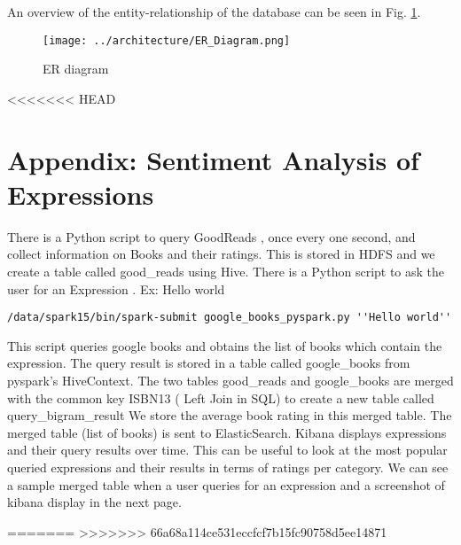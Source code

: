 \documentclass[12pt,letterpaper]{article}
\begin{document}
An overview of the entity-relationship of the database can be seen in Fig. \ref{ER}.


\begin{figure}[!ht]
\texttt{[image: ../architecture/ER\_Diagram.png]}
\caption{ER diagram \label{ER}}
\end{figure}

\appendix

<<<<<<< HEAD
\section{Appendix: Sentiment Analysis of Expressions}

There is a Python script to query GoodReads , once every one second, and collect information on Books and their ratings. This is stored in HDFS and we create a table called good\_reads using Hive.
There is a Python script to ask the user for an Expression . Ex: Hello world
\begin{verbatim}/data/spark15/bin/spark-submit google_books_pyspark.py ''Hello world'' \end{verbatim}
This script queries google books and obtains the list of books which contain the expression.
The query result is stored in a table called google\_books from pyspark's HiveContext.
The two tables good\_reads and google\_books are merged with the common key ISBN13 ( Left Join in SQL)  to create a new  table called query\_bigram\_result
We store the average book rating in this merged table.
The merged table (list of books) is sent to ElasticSearch. 
Kibana displays expressions and  their query results over time. This can be useful to look at the most popular queried expressions and their results in terms of ratings per category.
We can see a sample merged table when a user queries for an expression and a screenshot of kibana display in the next page.


=======
>>>>>>> 66a68a114ce531eccfcf7b15fc90758d5ee14871
\end{document}
